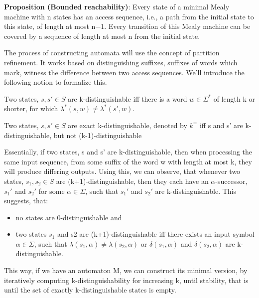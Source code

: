 \noindent \textbf{Proposition (Bounded reachability\cite{Steffen2011})}: Every state of a minimal Mealy machine with n states has an access sequence, i.e., a path from the initial state to this  state,  of  length  at  most n−1.  Every  transition  of  this  Mealy  machine  can be covered by a sequence of length at most n from the initial state.

The process of constructing automata will use the concept of partition refinement. It works based on distinguishing suffixes, suffixes of words which mark, witness the difference between two access sequences. We'll introduce the following notion to formalize this.


\begin{definition}
	Two states, $s,s'\in S$ are k-distinguishable iff there is a word $w\in\Sigma^*$ of length k or shorter, for which $\lambda^*(s, w)\neq\lambda^*(s',w)$.
\end{definition} 

\begin{definition}
	Two states, $s,s'\in S$ are exact k-distinguishable, denoted by $k^=$ iff s and s' are k-distinguishable, but not (k-1)-distinguishable
\end{definition}

Essentially, if two states, s and s' are  k-distinguishable, then when processing the same input sequence, from some suffix of the word w with length at most k, they will produce differing outputs. Using this, we can observe, that whenever two states, $s_1, s_2\in S$ are (k+1)-distinguishable, then they each have an $\alpha$-successor, $s_1'$ and $s_2'$ for some $\alpha\in\Sigma$, such that $s_1'$ and $s_2'$ are k-distinguishable. This suggests, that:
\begin{itemize}
	\item no states are 0-distinguishable and
	\item two states $s_1$ and s2 are (k+1)-distinguishable iff there exists an input symbol $\alpha\in\Sigma$, such that $\lambda(s_1, \alpha) \neq \lambda(s_2,\alpha)$ or $\delta(s_1, \alpha)$ and $\delta(s_2, \alpha)$ are k-distinguishable.\cite{Steffen2011}
\end{itemize}
This way, if we have an automaton M, we can construct its minimal version, by iteratively computing k-distinguishability for increasing k, until stability, that is until the set of exactly k-distinguishable states is empty.

